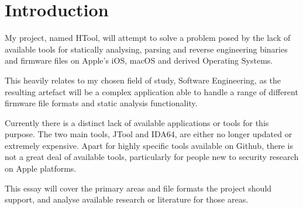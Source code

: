 \section{Introduction}


My project, named HTool, will attempt to solve a problem posed by the lack of available tools for statically analysing, parsing and reverse engineering binaries and firmware files on Apple's iOS, macOS and derived Operating Systems.

This heavily relates to my chosen field of study, Software Engineering, as the resulting artefact will be a complex application able to handle a range of different firmware file formats and static analysis functionality. 

Currently there is a distinct lack of available applications or tools for this purpose. The two main tools, JTool\cite{jtool} and IDA64\cite{ida64}, are either no longer updated or extremely expensive. Apart for highly specific tools available on Github, there is not a great deal of available tools, particularly for people new to security research on Apple platforms.

This essay will cover the primary areas and file formats the project should support, and analyse available research or literature for those areas.